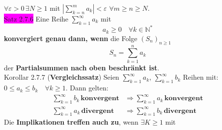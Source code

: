 \documentclass[landscape, 10pt]{article}
\newcommand{\N}{\mathbb{N}}
\begin{document}
\begin{multicols}{3}
                     \textcolor{NavyBlue}{
                     $\forall\varepsilon >0\,
                     \exists N\geqslant1$} mit 
                     \textcolor{NavyBlue}{
                     $|\sum_{k=n}^m a_k|<\varepsilon$\quad
                     $\forall m\geqslant n\geqslant N$}.\\
              \colorbox{magenta}{Satz 2.7.6} 
                     Eine Reihe \textcolor{NavyBlue}{
                     $\sum_{k=1}^\infty a_k$} mit 
                     \begin{equation*}
                            a_k\geqslant0\quad\forall k\in\N^*
                     \end{equation*}
                     \textbf{konvergiert genau dann, wenn} 
                     die Folge 
                     \textcolor{NavyBlue}{
                     $(S_n)_{n\geqslant1}$}
                     \begin{equation*}
                            S_n=\sum_{k=1}^n a_k
                     \end{equation*}
                     der \textbf{Partialsummen nach 
                     oben beschränkt ist}.\\
              \colorbox{BurntOrange}{Korollar 2.7.7} 
              (\textbf{Vergleichssatz}) 
                     Seien \textcolor{NavyBlue}{
                     $\sum_{k=1}^\infty a_k$}, 
                     \textcolor{NavyBlue}{
                     $\sum_{k=1}^\infty b_k$} 
                     Reihen mit: 
                     \textcolor{NavyBlue}{
                     $0\leqslant a_k\leqslant b_k\quad
                     \forall k\geqslant1$}. 
                     Dann gelten:
                     \begin{align*}
                            \sum_{k=1}^\infty b_k\,
                            \textbf{konvergent}
                            &\Longrightarrow 
                            \sum_{k=1}^\infty a_k\,
                            \textbf{konvergent}\\
                            \sum_{k=1}^\infty a_k\,
                            \textbf{divergent} 
                            &\Longrightarrow 
                            \sum_{k=1}^\infty b_k\,
                            \textbf{divergent} 
                     \end{align*}
                     Die \textbf{Implikationen treffen auch zu}, 
                     wenn \textcolor{NavyBlue}{
                     $\exists K\geqslant1$} mit 
                     \begin{equation*}

\end{equation*}
\end{multicols}
\end{document}
